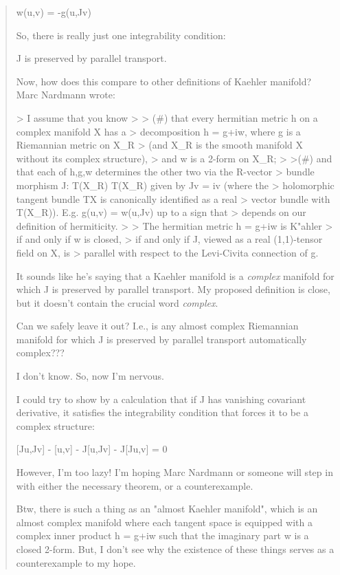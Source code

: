 \begin{quote}
w(u,v) = -g(u,Jv)

So, there is really just one integrability condition:

  J is preserved by parallel transport.

Now, how does this compare to other definitions of Kaehler
manifold?  Marc Nardmann wrote:

> I assume that you know
>
> (#) that every hermitian metric h on a complex manifold X has a
>     decomposition h = g+iw, where g is a Riemannian metric on X_R
>     (and X_R is the smooth manifold X without its complex structure),
>     and w is a 2-form on X_R;
>
>(#) and that each of h,g,w determines the other two via the R-vector
>     bundle morphism J: T(X_R) \to  T(X_R) given by Jv = iv (where the
>     holomorphic tangent bundle TX is canonically identified as a real
>     vector bundle with T(X_R)). E.g. g(u,v) = w(u,Jv) up to a sign that
>     depends on our definition of hermiticity.
>
> The hermitian metric h = g+iw is K"ahler
>     if and only if w is closed,
>     if and only if J, viewed as a real (1,1)-tensor field on X, is
>     parallel with respect to the Levi-Civita connection of g.

It sounds like he's saying that a Kaehler manifold is a \emph{complex}
manifold for which J is preserved by parallel transport.  My proposed
definition is close, but it doesn't contain the crucial word \emph{complex}.

Can we safely leave it out?  I.e., is any almost complex Riemannian
manifold for which J is preserved by parallel transport automatically
complex???

I don't know.  So, now I'm nervous.

I could try to show by a calculation that if J has vanishing
covariant derivative, it satisfies the integrability condition
that forces it to be a complex structure:

[Ju,Jv] - [u,v] - J[u,Jv] - J[Ju,v] = 0

However, I'm too lazy!  I'm hoping Marc Nardmann or someone 
will step in with either the necessary theorem, or a counterexample.

Btw, there is such a thing as an "almost Kaehler manifold",
which is an almost complex manifold where each tangent space
is equipped with a complex inner product h = g+iw such that the
imaginary part w is a closed 2-form.  But, I don't see why
the existence of these things serves as a counterexample to
my hope.
$$
    
\end{quote}

